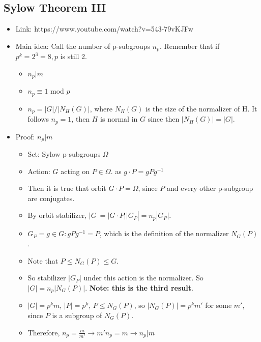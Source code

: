 \documentclass[11pt, oneside]{article}   	%
\begin{document}
\subsection{Sylow Theorem III}
\begin{itemize}
\item Link: https://www.youtube.com/watch?v=543-79vKJFw
\item Main idea: Call the number of p-subgroups $n_p$.  Remember that if $p^k= 2^3 = 8, p$ is still 2.
\begin{itemize}
\item $n_p | m$
\item $n_p \equiv 1$ mod $p$
\item $n_p = |G| / |N_H(G)|$, where $N_H(G)$ is the size of the normalizer of H.  It follows $n_p = 1$, then $H$ is normal in $G$ since then $|N_H(G)| = |G|$.
\end{itemize}

\item Proof: $n_p | m$
\begin{itemize}
\item Set: Sylow p-subgroups $\Omega$
\item Action: $G$ acting on $P \in \Omega$. as $g \cdot P = gPg^{-1}$
\item Then it is true that orbit $G \cdot P = \Omega$, since $P$ and every other p-subgroup are conjugates.
\item By orbit stabilizer, $|G\ = |G \cdot P| |G_P| = n_p |G_P|$.
\item $G_P = { g \in G: gPg^{-1} = P}$, which is the definition of the normalizer $N_G(P)$.
\item Note that $P \leq N_G(P) \leq G$.
\item So stabilizer $|G_P|$ under this action is the normalizer.  So  $|G| = n_p |N_G(P)|$.  \textbf{Note: this is the third result}.
\item $|G| = p^km$, $|P| = p^k$, $P \leq N_G(P)$, so $|N_G(P)| = p^km'$ for some $m'$, since $P$ is a subgroup of $N_G(P)$.
\item Therefore, $n_p = \frac{m}{m'} \rightarrow m'n_p = m \rightarrow n_p | m$
\end{itemize}


\end{itemize}
\end{document}
